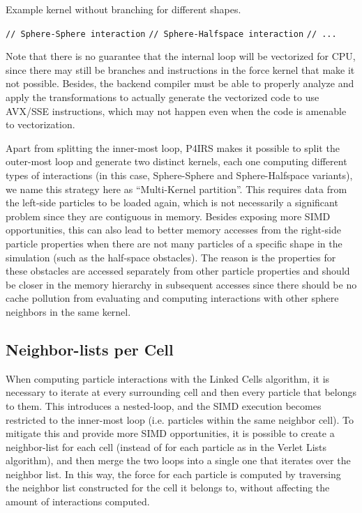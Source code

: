 \documentclass[preprint,12pt]{elsarticle}
\begin{document}
\begin{algorithm}[H]
  \caption{Example kernel without branching for different shapes.}
  \label{alg:no_branching}
  \begin{algorithmic}[1]
        \State \texttt{// Sphere-Sphere interaction}
      \EndFor
        \State \texttt{// Sphere-Halfspace interaction}
      \EndFor
      \State \texttt{// ...}
    \EndFor
  \end{algorithmic}
\end{algorithm}

Note that there is no guarantee that the internal loop will be vectorized for CPU, since there may still be branches and instructions in the force kernel that make it not possible.
Besides, the backend compiler must be able to properly analyze and apply the transformations to actually generate the vectorized code to use AVX/SSE instructions, which may not happen even when the code is amenable to vectorization.

Apart from splitting the inner-most loop, P4IRS makes it possible to split the outer-most loop and generate two distinct kernels, each one computing different types of interactions (in this case, Sphere-Sphere and Sphere-Halfspace variants), we name this strategy here as ``Multi-Kernel partition''.
This requires data from the left-side particles to be loaded again, which is not necessarily a significant problem since they are contiguous in memory.
Besides exposing more SIMD opportunities, this can also lead to better memory accesses from the right-side particle properties when there are not many particles of a specific shape in the simulation (such as the half-space obstacles).
The reason is the properties for these obstacles are accessed separately from other particle properties and should be closer in the memory hierarchy in subsequent accesses since there should be no cache pollution from evaluating and computing interactions with other sphere neighbors in the same kernel.

\subsection{Neighbor-lists per Cell}
\label{sec:neighbor_lists_per_cell}

When computing particle interactions with the Linked Cells algorithm, it is necessary to iterate at every surrounding cell and then every particle that belongs to them.
This introduces a nested-loop, and the SIMD execution becomes restricted to the inner-most loop (i.e. particles within the same neighbor cell).
To mitigate this and provide more SIMD opportunities, it is possible to create a neighbor-list for each cell (instead of for each particle as in the Verlet Lists algorithm), and then merge the two loops into a single one that iterates over the neighbor list.
In this way, the force for each particle is computed by traversing the neighbor list constructed for the cell it belongs to, without affecting the amount of interactions computed.
\end{document}
